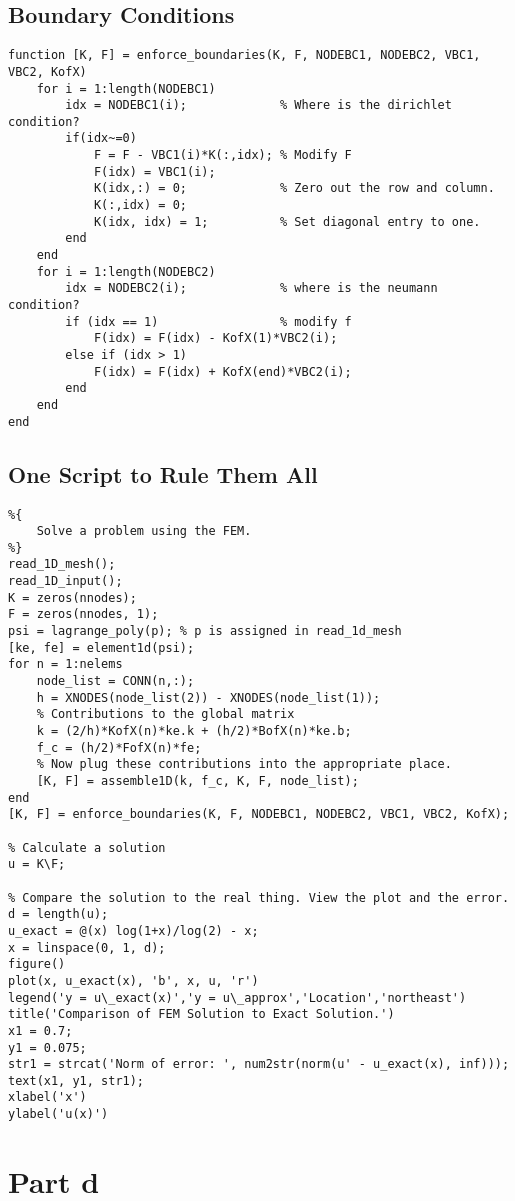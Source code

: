 \documentclass[10pt]{article}
\begin{document}
\subsection*{Boundary Conditions}
\begin{lstlisting}
function [K, F] = enforce_boundaries(K, F, NODEBC1, NODEBC2, VBC1, VBC2, KofX)
    for i = 1:length(NODEBC1)
        idx = NODEBC1(i);             % Where is the dirichlet condition?
        if(idx~=0)		
            F = F - VBC1(i)*K(:,idx); % Modify F
            F(idx) = VBC1(i);
            K(idx,:) = 0;             % Zero out the row and column.
            K(:,idx) = 0;
            K(idx, idx) = 1;          % Set diagonal entry to one.
        end
    end
    for i = 1:length(NODEBC2)
        idx = NODEBC2(i);             % where is the neumann condition?
        if (idx == 1)                 % modify f
            F(idx) = F(idx) - KofX(1)*VBC2(i);
        else if (idx > 1)
            F(idx) = F(idx) + KofX(end)*VBC2(i);
        end        
    end
end
\end{lstlisting}
\subsection*{One Script to Rule Them All}
\begin{lstlisting}
%{
    Solve a problem using the FEM.
%}
read_1D_mesh();
read_1D_input();
K = zeros(nnodes);
F = zeros(nnodes, 1);
psi = lagrange_poly(p); % p is assigned in read_1d_mesh
[ke, fe] = element1d(psi);
for n = 1:nelems
    node_list = CONN(n,:);
    h = XNODES(node_list(2)) - XNODES(node_list(1)); 
    % Contributions to the global matrix
    k = (2/h)*KofX(n)*ke.k + (h/2)*BofX(n)*ke.b;
    f_c = (h/2)*FofX(n)*fe;
    % Now plug these contributions into the appropriate place.
    [K, F] = assemble1D(k, f_c, K, F, node_list);
end
[K, F] = enforce_boundaries(K, F, NODEBC1, NODEBC2, VBC1, VBC2, KofX);

% Calculate a solution
u = K\F;

% Compare the solution to the real thing. View the plot and the error.
d = length(u);
u_exact = @(x) log(1+x)/log(2) - x;
x = linspace(0, 1, d);
figure()
plot(x, u_exact(x), 'b', x, u, 'r')
legend('y = u\_exact(x)','y = u\_approx','Location','northeast')
title('Comparison of FEM Solution to Exact Solution.')
x1 = 0.7;
y1 = 0.075;
str1 = strcat('Norm of error: ', num2str(norm(u' - u_exact(x), inf)));
text(x1, y1, str1);
xlabel('x')
ylabel('u(x)')
\end{lstlisting}
\section*{Part d}
\end{document}
